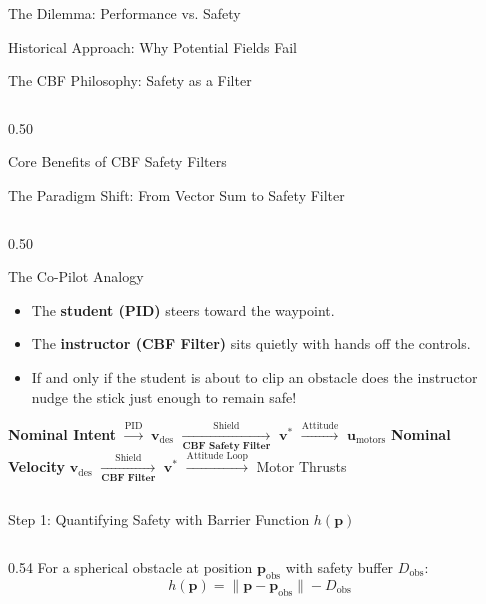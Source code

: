 \documentclass[aspectratio=169,10pt]{beamer}
\begin{document}
\begin{frame}{The Dilemma: Performance vs. Safety}
\begin{frame}{Historical Approach: Why Potential Fields Fail}
\begin{frame}{The CBF Philosophy: Safety as a Filter}
\begin{column}{0.50\textwidth}
\begin{exampleblock}{Core Benefits of CBF Safety Filters}
\begin{frame}{The Paradigm Shift: From Vector Sum to Safety Filter}
\begin{columns}[T]
    \begin{column}{0.50\textwidth}
      \begin{block}{The Co-Pilot Analogy}
        \small
        \begin{itemize}
          \item The \textbf{student (PID)} steers toward the waypoint.
          \item The \textbf{instructor (CBF Filter)} sits quietly with hands off the controls.
          \item If and only if the student is about to clip an obstacle does the instructor nudge the stick just enough to remain safe!
        \end{itemize}
      \end{block}

      \vspace{0.3em}
      \centering
      \small \textbf{Nominal Intent} $\xrightarrow{\text{PID}}$ $\mathbf{v}_{\mathrm{des}}$ $\xrightarrow[\textbf{CBF Safety Filter}]{\text{Shield}}$ $\mathbf{v}^*$ $\xrightarrow{\text{Attitude}}$ $\mathbf{u}_{\mathrm{motors}}$
      \small \textbf{Nominal Velocity} $\mathbf{v}_{\mathrm{des}}$ $\xrightarrow[\textbf{CBF Filter}]{\text{Shield}}$ $\mathbf{v}^*$ $\xrightarrow{\text{Attitude Loop}}$ Motor Thrusts
    \end{column}
  \end{columns}
\end{frame}

\begin{frame}{Step 1: Quantifying Safety with Barrier Function $h(\mathbf{p})$}
  \begin{columns}[T]
    \begin{column}{0.54\textwidth}
      For a spherical obstacle at position $\mathbf{p}_{\mathrm{obs}}$ with safety buffer $D_{\mathrm{obs}}$:
      \begin{equation*}
        h(\mathbf{p}) = \|\mathbf{p} - \mathbf{p}_{\mathrm{obs}}\| - D_{\mathrm{obs}}
      \end{equation*}


\end{column}
\end{columns}
\end{frame}
\end{exampleblock}
\end{column}
\end{frame}
\end{frame}
\end{frame}
\end{document}
